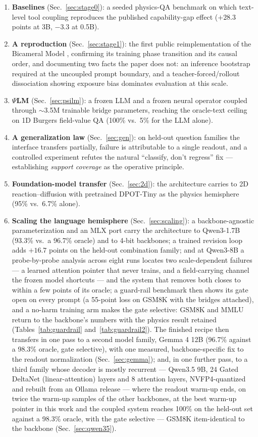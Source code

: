 \documentclass[11pt]{article}
\newcommand{\psilm}{$\Psi$LM}
\begin{document}
\begin{enumerate}
\item \textbf{Baselines} (Sec.~\ref{sec:stage0}): a seeded physics-QA benchmark on which text-level tool coupling reproduces the published capability-gap effect ($+28.3$ points at 3B, $-3.3$ at 0.5B).
\item \textbf{A reproduction} (Sec.~\ref{sec:stage1}): the first public reimplementation of the Bicameral Model \citep{flamant2026bicameral}, confirming its training phase transition and its causal order, and documenting two facts the paper does not: an inference bootstrap required at the uncoupled prompt boundary, and a teacher-forced/rollout dissociation showing exposure bias dominates evaluation at this scale.
\item \textbf{\psilm{}} (Sec.~\ref{sec:psilm}): a frozen LLM and a frozen neural operator coupled through $\sim$3.5M trainable bridge parameters, reaching the oracle-text ceiling on 1D Burgers field-value QA (100\% vs.\ 5\% for the LLM alone).
\item \textbf{A generalization law} (Sec.~\ref{sec:gen}): on held-out question families the interface transfers partially, failure is attributable to a single readout, and a controlled experiment refutes the natural ``classify, don't regress'' fix --- establishing \emph{support coverage} as the operative principle.
\item \textbf{Foundation-model transfer} (Sec.~\ref{sec:2d}): the architecture carries to 2D reaction--diffusion with pretrained DPOT-Tiny \citep{hao2024dpot} as the physics hemisphere (95\% vs.\ 6.7\% alone).
\item \textbf{Scaling the language hemisphere} (Sec.~\ref{sec:scaling}): a backbone-agnostic parameterization and an MLX port carry the architecture to Qwen3-1.7B (93.3\% vs.\ a 96.7\% oracle) and to 4-bit backbones; a trained revision loop adds $+16.7$ points on the held-out combination family; and at Qwen3-8B a probe-by-probe analysis across eight runs locates two scale-dependent failures --- a learned attention pointer that never trains, and a field-carrying channel the frozen model shortcuts --- and the system that removes both closes to within a few points of its oracle; a guard-rail benchmark then shows its gate open on every prompt (a 55-point loss on GSM8K with the bridges attached), and a no-harm training arm makes the gate selective: GSM8K and MMLU return to the backbone's numbers with the physics result retained (Tables~\ref{tab:guardrail} and~\ref{tab:guardrail2}). The finished recipe then transfers in one pass to a second model family, Gemma 4 12B (96.7\% against a 98.3\% oracle, gate selective), with one measured, backbone-specific fix to the readout normalization (Sec.~\ref{sec:gemma}); and, in one further pass, to a third family whose decoder is mostly recurrent --- Qwen3.5 9B, 24 Gated DeltaNet (linear-attention) layers and 8 attention layers, NVFP4-quantized and rebuilt from an Ollama release --- where the readout warm-up ends, on twice the warm-up samples of the other backbones, at the best warm-up pointer in this work and the coupled system reaches 100\% on the held-out set against a 98.3\% oracle, with the gate selective --- GSM8K item-identical to the backbone (Sec.~\ref{sec:qwen35}).

\end{enumerate}
\end{document}
